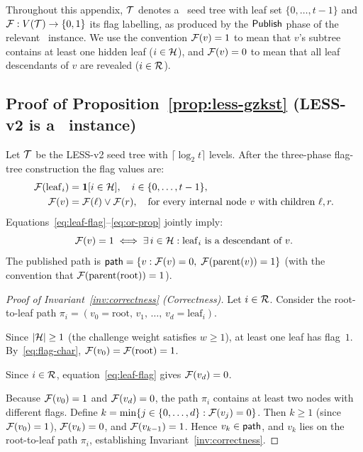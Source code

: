
Throughout this appendix, $\mathcal{T}$ denotes a \GGM\ seed tree with leaf set
$\{0,\ldots,t-1\}$ and $\mathcal{F} : V(\mathcal{T}) \to \{0,1\}$ its flag labelling,
as produced by the $\mathsf{Publish}$ phase of the relevant \GZKST\ instance.
We use the convention $\mathcal{F}(v) = 1$ to mean that $v$'s subtree contains at
least one hidden leaf ($i \in \mathcal{H}$), and $\mathcal{F}(v) = 0$ to mean that all
leaf descendants of $v$ are revealed ($i \in \mathcal{R}$).

\subsection{Proof of Proposition~\ref{prop:less-gzkst}
  (LESS-v2 is a \GZKST\ instance)}
\label{app:proof-less}

Let $\mathcal{T}$ be the LESS-v2 seed tree with $\lceil \log_2 t \rceil$ levels.
After the three-phase flag-tree construction the flag values are:
\begin{align}
  \mathcal{F}(\mathrm{leaf}_i) &= \mathbf{1}[i \in \mathcal{H}], \quad i \in \{0,\ldots,t-1\},
  \label{eq:leaf-flag}\\
  \mathcal{F}(v) &= \mathcal{F}(\ell) \vee \mathcal{F}(r), \quad \text{for every internal node } v
  \text{ with children } \ell, r.
  \label{eq:or-prop}
\end{align}
Equations~\eqref{eq:leaf-flag}--\eqref{eq:or-prop} jointly imply:
\begin{equation}
  \mathcal{F}(v) = 1 \iff \exists\, i \in \mathcal{H} : \mathrm{leaf}_i
  \text{ is a descendant of } v.
  \label{eq:flag-char}
\end{equation}
The published path is
$\mathsf{path} = \{v : \mathcal{F}(v) = 0,\; \mathcal{F}(\mathrm{parent}(v)) = 1\}$
(with the convention that $\mathcal{F}(\mathrm{parent}(\mathrm{root})) = 1$).

\begin{proof}[Proof of Invariant~\ref{inv:correctness} (Correctness)]
Let $i \in \mathcal{R}$.  Consider the root-to-leaf path
$\pi_i = (v_0 = \mathrm{root},\, v_1,\, \ldots,\, v_d = \mathrm{leaf}_i)$.

Since $|\mathcal{H}| \geq 1$ (the challenge weight satisfies $w \geq 1$), at least one
leaf has flag~$1$.  By~\eqref{eq:flag-char}, $\mathcal{F}(v_0) = \mathcal{F}(\mathrm{root}) = 1$.

Since $i \in \mathcal{R}$, equation~\eqref{eq:leaf-flag} gives $\mathcal{F}(v_d) = 0$.

Because $\mathcal{F}(v_0) = 1$ and $\mathcal{F}(v_d) = 0$, the path $\pi_i$ contains
at least two nodes with different flags.  Define
$k = \min\{j \in \{0,\ldots,d\} : \mathcal{F}(v_j) = 0\}$.
Then $k \geq 1$ (since $\mathcal{F}(v_0) = 1$), $\mathcal{F}(v_k) = 0$, and
$\mathcal{F}(v_{k-1}) = 1$.  Hence $v_k \in \mathsf{path}$, and $v_k$ lies on
the root-to-leaf path $\pi_i$, establishing Invariant~\ref{inv:correctness}.
\end{proof}

